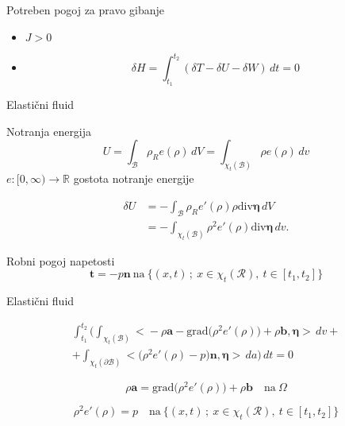 \documentclass{beamer}
\newcommand{\R}{\mathbb R} %
\newcommand{\B}{\mathcal B} %
\newcommand{\vek}[1]{\boldsymbol #1} %
\newcommand{\grad}{\mathrm{grad}} %
\renewcommand{\div}{\mathrm{div}} %
\begin{document}
\begin{frame}{Potreben pogoj za pravo gibanje}

\begin{itemize}
	\item $J>0$
	\item \[ \delta H = \int_{t_1}^{t_2}(\delta T-\delta U-\delta W)\,dt = 0 \]
\end{itemize}

\end{frame}


\begin{frame}{Elastični fluid}

\begin{block}{Notranja energija}
	\[ U=\int_{\B}\rho_R e(\rho)\,dV=\int_{\chi_t(\B)}\rho e(\rho)\,dv \]
	$e\colon[0,\infty)\to\R$ gostota notranje energije
\end{block}

\begin{align*} 
	\delta U &=-\int_{\B}\rho_R e'(\rho)\rho\div\vek{\eta}\,dV \\
	&= -\int_{\chi_t(\B)}\rho^2 e'(\rho)\div\vek{\eta}\,dv.
\end{align*}

\begin{block}{Robni pogoj napetosti}
	\[ \vek{t}=-p\vek{n}\ \textrm{na}\ \{ (x,t)\,;\ x\in\chi_t(\mathcal{R}),\ t\in[t_1,t_2] \} \]
\end{block}

\end{frame}


\begin{frame}{Elastični fluid}

\begin{multline*}
	\int_{t_1}^{t_2}\bigg( \int_{\chi_t(\B)}\Big<-\rho\vek{a}-
	\grad\big(\rho^2 e'(\rho)\big)+\rho\vek{b},\vek{\eta}\Big>\,dv+ \\
	+\int_{\chi_t(\partial \B)}\big<\big(\rho^2 e'(\rho)-p\big)\vek{n},\vek{\eta}\big>\,da\bigg)\,dt=0
\end{multline*}

\begin{equation*}
	\rho\vek{a}=\grad\big(\rho^2 e'(\rho)\big)+\rho\vek{b}\quad
	\textrm{na}\ \Omega
\end{equation*}

\begin{equation*}
	\rho^2 e'(\rho)=p \quad\textrm{na}\ \{ (x,t)\,;\ x\in\chi_t(\mathcal{R}),\ t\in[t_1,t_2] \}
\end{equation*}

\end{frame}
\end{document}
